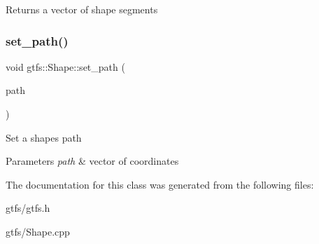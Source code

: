 \begin{DoxyReturn}{Returns}
a vector of shape segments 
\end{DoxyReturn}
\mbox{\label{classgtfs_1_1Shape_a39e7bb353e89f954d36eb7f9ca4820b9}} 
\subsubsection{\texorpdfstring{set\+\_\+path()}{set\_path()}}
{\footnotesize\ttfamily void gtfs\+::\+Shape\+::set\+\_\+path (\begin{DoxyParamCaption}\item[{std\+::vector$<$ \hyperlink{structgtfs_1_1ShapePt}{Shape\+Pt} $>$ \&}]{path }\end{DoxyParamCaption})}

Set a shape\textquotesingle{}s path 
\begin{DoxyParams}{Parameters}
{\em path} & vector of coordinates \\
\hline
\end{DoxyParams}


The documentation for this class was generated from the following files\+:\begin{DoxyCompactItemize}
\item 
gtfs/gtfs.\+h\item 
gtfs/Shape.\+cpp\end{DoxyCompactItemize}
